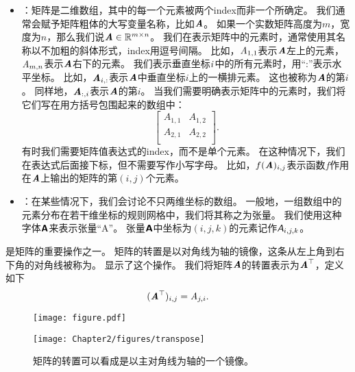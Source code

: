 \begin{itemize}
    \item {}：矩阵是二维数组，其中的每一个元素被两个\gls{index}而非一个所确定。
    我们通常会赋予矩阵粗体的大写变量名称，比如$\boldsymbol{\mathit{A}}$。
    如果一个实数矩阵高度为$m$，宽度为$n$，那么我们说$\boldsymbol{\mathit{A}}\in \mathbb{R}^{m\times n}$。
    我们在表示矩阵中的元素时，通常使用其名称以不加粗的斜体形式，\gls{index}用逗号间隔。
    比如，$\mathit{A}_{1,1}$表示$\boldsymbol{\mathit{A}}$左上的元素，$\mathit{A}_{m,n}$表示$\boldsymbol{\mathit{A}}$右下的元素。
    我们表示垂直坐标$\mathit{i}$中的所有元素时，用``:''表示水平坐标。
    比如，$\boldsymbol{\mathit{A}}_{i,:}$表示$\boldsymbol{\mathit{A}}$中垂直坐标$i$上的一横排元素。
    这也被称为$\boldsymbol{\mathit{A}}$的第$i$。
    同样地，$\boldsymbol{\mathit{A}}_{:,i}$表示$\boldsymbol{\mathit{A}}$的第$i$。
    当我们需要明确表示矩阵中的元素时，我们将它们写在用方括号包围起来的数组中：
    \begin{equation}
        \begin{bmatrix}
            A_{1,1} & A_{1,2} \\
            A_{2,1} & A_{2,2} \\
        \end{bmatrix}.
    \end{equation}
    有时我们需要矩阵值表达式的\gls{index}，而不是单个元素。
    在这种情况下，我们在表达式后面接下标，但不需要写作小写字母。
    比如，$f(\boldsymbol{\mathit{A}})_{i,j}$表示函数$f$作用在$\boldsymbol{\mathit{A}}$上输出的矩阵的第$(i,j)$个元素。


    \item {}：在某些情况下，我们会讨论不只两维坐标的数组。
    一般地，一组数组中的元素分布在若干维坐标的规则网格中，我们将其称之为张量。
    我们使用这种字体$\textsf{\textbf{A}}$来表示张量``A''。
    张量$\textsf{\textbf{A}}$中坐标为$(i,j,k)$的元素记作$\textsf{\emph{A}}_{i,j,k}$。
\end{itemize}


是矩阵的重要操作之一。
矩阵的转置是以对角线为轴的镜像，这条从左上角到右下角的对角线被称为。
显示了这个操作。
我们将矩阵$\boldsymbol{\mathit{A}}$的转置表示为$\boldsymbol{\mathit{A}}^\top$，定义如下
\begin{equation}
(\boldsymbol{\mathit{A}}^\top)_{i,j}= \mathit{A}_{j,i}.
\end{equation}

\begin{figure}[!htb]
\ifOpenSource
\centerline{\texttt{[image: figure.pdf]}}
\else
\centerline{\texttt{[image: Chapter2/figures/transpose]}}
\fi
\caption{矩阵的转置可以看成是以主对角线为轴的一个镜像。}
\label{fig:chap2_transpose}
\end{figure}

